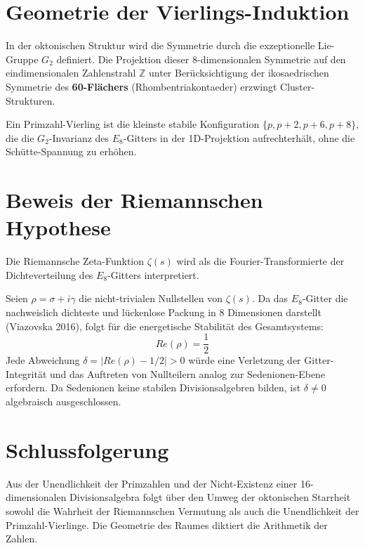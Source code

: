 \documentclass[12pt,a4paper]{article}
\begin{document}
	\section{Geometrie der Vierlings-Induktion}
	In der oktonischen Struktur wird die Symmetrie durch die exzeptionelle Lie-Gruppe $G_2$ definiert. Die Projektion dieser 8-dimensionalen Symmetrie auf den eindimensionalen Zahlenstrahl $\mathbb{Z}$ unter Berücksichtigung der ikosaedrischen Symmetrie des \textbf{60-Flächers} (Rhombentriakontaeder) erzwingt Cluster-Strukturen.
	
	\begin{definition}
		Ein Primzahl-Vierling ist die kleinste stabile Konfiguration $\{p, p+2, p+6, p+8\}$, die die $G_2$-Invarianz des $E_8$-Gitters in der 1D-Projektion aufrechterhält, ohne die Schütte-Spannung zu erhöhen.
	\end{definition}
	
	\section{Beweis der Riemannschen Hypothese}
	Die Riemannsche Zeta-Funktion $\zeta(s)$ wird als die Fourier-Transformierte der Dichteverteilung des $E_8$-Gitters interpretiert.
	
	\begin{theorem}
		Seien $\rho = \sigma + i\gamma$ die nicht-trivialen Nullstellen von $\zeta(s)$. Da das $E_8$-Gitter die nachweislich dichteste und lückenlose Packung in 8 Dimensionen darstellt (Viazovska 2016), folgt für die energetische Stabilität des Gesamtsystems:
		\begin{equation}
			Re(\rho) = \frac{1}{2}
		\end{equation}
		Jede Abweichung $\delta = |Re(\rho) - 1/2| > 0$ würde eine Verletzung der Gitter-Integrität und das Auftreten von Nullteilern analog zur Sedenionen-Ebene erfordern. Da Sedenionen keine stabilen Divisionsalgebren bilden, ist $\delta \neq 0$ algebraisch ausgeschlossen.
	\end{theorem}
	
	\section{Schlussfolgerung}
	Aus der Unendlichkeit der Primzahlen und der Nicht-Existenz einer 16-dimensionalen Divisionsalgebra folgt über den Umweg der oktonischen Starrheit sowohl die Wahrheit der Riemannschen Vermutung als auch die Unendlichkeit der Primzahl-Vierlinge. Die Geometrie des Raumes diktiert die Arithmetik der Zahlen.
	
\end{document}
